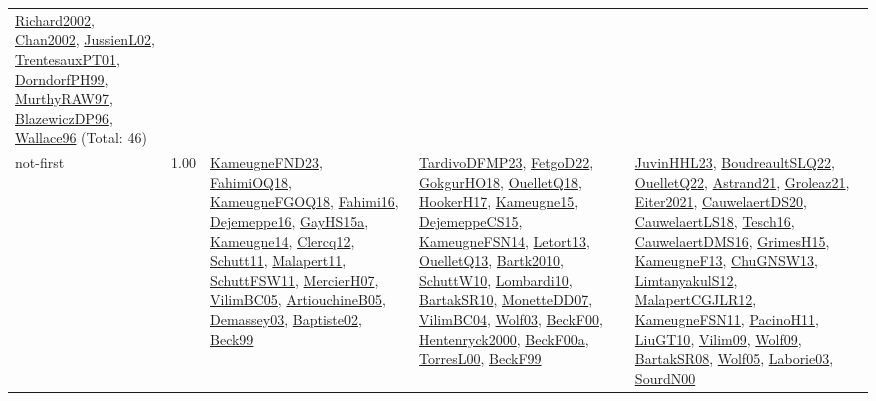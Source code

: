 {\begin{longtable}{p{3cm}r>{\raggedright\arraybackslash}p{6cm}>{\raggedright\arraybackslash}p{6cm}>{\raggedright\arraybackslash}p{8cm}}
\hyperref[detail:Richard2002]{Richard2002}, \hyperref[detail:Chan2002]{Chan2002}, \hyperref[detail:JussienL02]{JussienL02}, \hyperref[detail:TrentesauxPT01]{TrentesauxPT01}, \hyperref[detail:DorndorfPH99]{DorndorfPH99}, \hyperref[detail:MurthyRAW97]{MurthyRAW97}, \hyperref[detail:BlazewiczDP96]{BlazewiczDP96}, \hyperref[detail:Wallace96]{Wallace96} (Total: 46)\\
\index{not-first}\index{Algorithms!not-first}not-first &  1.00 & \hyperref[detail:KameugneFND23]{KameugneFND23}, \hyperref[detail:FahimiOQ18]{FahimiOQ18}, \hyperref[detail:KameugneFGOQ18]{KameugneFGOQ18}, \hyperref[detail:Fahimi16]{Fahimi16}, \hyperref[detail:Dejemeppe16]{Dejemeppe16}, \hyperref[detail:GayHS15a]{GayHS15a}, \hyperref[detail:Kameugne14]{Kameugne14}, \hyperref[detail:Clercq12]{Clercq12}, \hyperref[detail:Schutt11]{Schutt11}, \hyperref[detail:Malapert11]{Malapert11}, \hyperref[detail:SchuttFSW11]{SchuttFSW11}, \hyperref[detail:MercierH07]{MercierH07}, \hyperref[detail:VilimBC05]{VilimBC05}, \hyperref[detail:ArtiouchineB05]{ArtiouchineB05}, \hyperref[detail:Demassey03]{Demassey03}, \hyperref[detail:Baptiste02]{Baptiste02}, \hyperref[detail:Beck99]{Beck99} & \hyperref[detail:TardivoDFMP23]{TardivoDFMP23}, \hyperref[detail:FetgoD22]{FetgoD22}, \hyperref[detail:GokgurHO18]{GokgurHO18}, \hyperref[detail:OuelletQ18]{OuelletQ18}, \hyperref[detail:HookerH17]{HookerH17}, \hyperref[detail:Kameugne15]{Kameugne15}, \hyperref[detail:DejemeppeCS15]{DejemeppeCS15}, \hyperref[detail:KameugneFSN14]{KameugneFSN14}, \hyperref[detail:Letort13]{Letort13}, \hyperref[detail:OuelletQ13]{OuelletQ13}, \hyperref[detail:Bartk2010]{Bartk2010}, \hyperref[detail:SchuttW10]{SchuttW10}, \hyperref[detail:Lombardi10]{Lombardi10}, \hyperref[detail:BartakSR10]{BartakSR10}, \hyperref[detail:MonetteDD07]{MonetteDD07}, \hyperref[detail:VilimBC04]{VilimBC04}, \hyperref[detail:Wolf03]{Wolf03}, \hyperref[detail:BeckF00]{BeckF00}, \hyperref[detail:Hentenryck2000]{Hentenryck2000}, \hyperref[detail:BeckF00a]{BeckF00a}, \hyperref[detail:TorresL00]{TorresL00}, \hyperref[detail:BeckF99]{BeckF99} & \hyperref[detail:JuvinHHL23]{JuvinHHL23}, \hyperref[detail:BoudreaultSLQ22]{BoudreaultSLQ22}, \hyperref[detail:OuelletQ22]{OuelletQ22}, \hyperref[detail:Astrand21]{Astrand21}, \hyperref[detail:Groleaz21]{Groleaz21}, \hyperref[detail:Eiter2021]{Eiter2021}, \hyperref[detail:CauwelaertDS20]{CauwelaertDS20}, \hyperref[detail:CauwelaertLS18]{CauwelaertLS18}, \hyperref[detail:Tesch16]{Tesch16}, \hyperref[detail:CauwelaertDMS16]{CauwelaertDMS16}, \hyperref[detail:GrimesH15]{GrimesH15}, \hyperref[detail:KameugneF13]{KameugneF13}, \hyperref[detail:ChuGNSW13]{ChuGNSW13}, \hyperref[detail:LimtanyakulS12]{LimtanyakulS12}, \hyperref[detail:MalapertCGJLR12]{MalapertCGJLR12}, \hyperref[detail:KameugneFSN11]{KameugneFSN11}, \hyperref[detail:PacinoH11]{PacinoH11}, \hyperref[detail:LiuGT10]{LiuGT10}, \hyperref[detail:Vilim09]{Vilim09}, \hyperref[detail:Wolf09]{Wolf09}, \hyperref[detail:BartakSR08]{BartakSR08}, \hyperref[detail:Wolf05]{Wolf05}, \hyperref[detail:Laborie03]{Laborie03}, \hyperref[detail:SourdN00]{SourdN00}\\

\end{longtable}}
